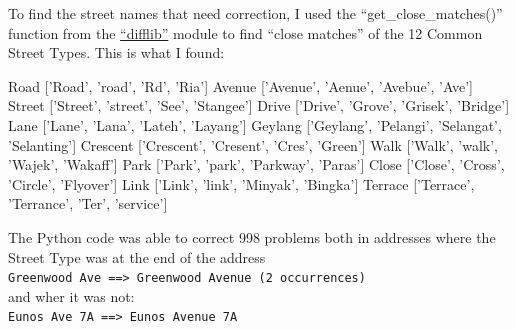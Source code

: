 \documentclass[11pt]{article}
\newenvironment{Shaded}{}{}
\newcommand{\StringTok}[1]{\textcolor[rgb]{0.25,0.44,0.63}{{#1}}}
\newcommand{\NormalTok}[1]{{#1}}
\begin{document}
    To find the street names that need correction, I used the
``get\_close\_matches()'' function from the
\href{https://docs.python.org/2/library/difflib.html?highlight=get_close_matches}{``difflib''}
module to find ``close matches'' of the 12 Common Street Types. This is
what I found:

    \begin{Shaded}
\begin{Highlighting}[]
\NormalTok{Road [}\StringTok{'Road'}\NormalTok{, }\StringTok{'road'}\NormalTok{, }\StringTok{'Rd'}\NormalTok{, }\StringTok{'Ria'}\NormalTok{]  }
\NormalTok{Avenue [}\StringTok{'Avenue'}\NormalTok{, }\StringTok{'Aenue'}\NormalTok{, }\StringTok{'Avebue'}\NormalTok{, }\StringTok{'Ave'}\NormalTok{]  }
\NormalTok{Street [}\StringTok{'Street'}\NormalTok{, }\StringTok{'street'}\NormalTok{, }\StringTok{'See'}\NormalTok{, }\StringTok{'Stangee'}\NormalTok{]  }
\NormalTok{Drive [}\StringTok{'Drive'}\NormalTok{, }\StringTok{'Grove'}\NormalTok{, }\StringTok{'Grisek'}\NormalTok{, }\StringTok{'Bridge'}\NormalTok{]  }
\NormalTok{Lane [}\StringTok{'Lane'}\NormalTok{, }\StringTok{'Lana'}\NormalTok{, }\StringTok{'Lateh'}\NormalTok{, }\StringTok{'Layang'}\NormalTok{]  }
\NormalTok{Geylang [}\StringTok{'Geylang'}\NormalTok{, }\StringTok{'Pelangi'}\NormalTok{, }\StringTok{'Selangat'}\NormalTok{, }\StringTok{'Selanting'}\NormalTok{]  }
\NormalTok{Crescent [}\StringTok{'Crescent'}\NormalTok{, }\StringTok{'Cresent'}\NormalTok{, }\StringTok{'Cres'}\NormalTok{, }\StringTok{'Green'}\NormalTok{]  }
\NormalTok{Walk [}\StringTok{'Walk'}\NormalTok{, }\StringTok{'walk'}\NormalTok{, }\StringTok{'Wajek'}\NormalTok{, }\StringTok{'Wakaff'}\NormalTok{]  }
\NormalTok{Park [}\StringTok{'Park'}\NormalTok{, }\StringTok{'park'}\NormalTok{, }\StringTok{'Parkway'}\NormalTok{, }\StringTok{'Paras'}\NormalTok{]  }
\NormalTok{Close [}\StringTok{'Close'}\NormalTok{, }\StringTok{'Cross'}\NormalTok{, }\StringTok{'Circle'}\NormalTok{, }\StringTok{'Flyover'}\NormalTok{]  }
\NormalTok{Link [}\StringTok{'Link'}\NormalTok{, }\StringTok{'link'}\NormalTok{, }\StringTok{'Minyak'}\NormalTok{, }\StringTok{'Bingka'}\NormalTok{]  }
\NormalTok{Terrace [}\StringTok{'Terrace'}\NormalTok{, }\StringTok{'Terrance'}\NormalTok{, }\StringTok{'Ter'}\NormalTok{, }\StringTok{'service'}\NormalTok{]}
\end{Highlighting}
\end{Shaded}

    The Python code was able to correct 998 problems both in addresses where
the Street Type was at the end of the address\\
\texttt{Greenwood\ Ave\ ==\textgreater{}\ Greenwood\ Avenue\ (2\ occurrences)}\\
and wher it was not:\\
\texttt{Eunos\ Ave\ 7A\ ==\textgreater{}\ Eunos\ Avenue\ 7A}
\end{document}
